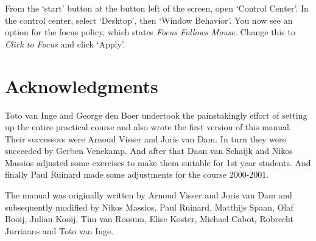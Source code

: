 \documentclass[10pt]{scrartcl}
\begin{document}
From the `start' button at the button left of the screen, open `Control
Center'. In the control center, select `Desktop', then `Window Behavior'.
You now see an option for the focus policy, which states {\it Focus Follows Mouse}.
Change this to {\it Click to Focus} and click `Apply'.


%
%
%


\section*{Acknowledgments}

Toto van Inge and George den Boer undertook the painstakingly effort of
setting up the entire practical course and also wrote the first version
of this manual.  Their successors were Arnoud Visser and Joris van Dam.
In turn they were succeeded by Gerben Venekamp. And after that Daan van
Schaijk and Nikos Massios adjusted some exercises to make them suitable
for 1st year students. And finally Paul Ruinard made some adjustments
for the course 2000-2001.

The manual was originally written by Arnoud Visser and Joris van Dam and
subsequently modified by Nikos Massios, Paul Ruinard, Matthijs Spaan,
Olaf Booij, Julian Kooij, Tim van Rossum, Elise Koster, Michael Cabot, Robrecht Jurriaans and Toto van Inge.
\end{document}
